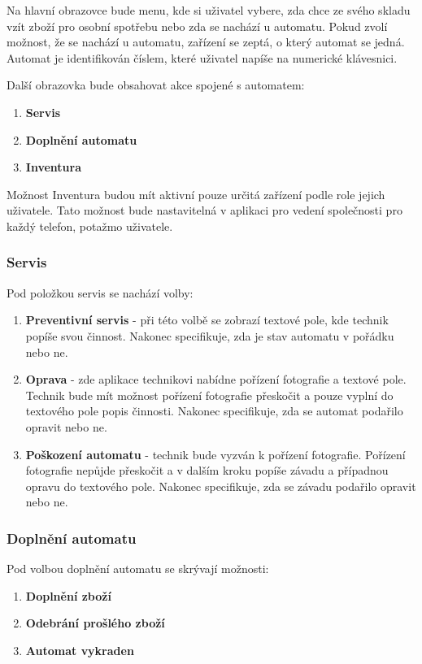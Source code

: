 \documentclass[a4paper,10pt]{article}
\begin{document}
Na hlavní obrazovce bude menu, kde si uživatel vybere, zda chce ze svého skladu vzít zboží pro osobní spotřebu nebo zda se nachází u automatu. Pokud zvolí možnost, že se nachází u automatu, zařízení se zeptá, o který automat se jedná. Automat je identifikován číslem, které uživatel napíše na numerické klávesnici.

Další obrazovka bude obsahovat akce spojené s automatem:

\begin{enumerate}
	\item \textbf{Servis}
	\item \textbf{Doplnění automatu}
	\item \textbf{Inventura}
\end{enumerate}

Možnost Inventura budou mít aktivní pouze určitá zařízení podle role jejich uživatele. Tato možnost bude nastavitelná v aplikaci pro vedení společnosti pro každý telefon, potažmo uživatele.

\subsubsection{Servis}
Pod položkou servis se nachází volby:
\begin{enumerate}
	\item \textbf{Preventivní servis} - při této volbě se zobrazí textové pole, kde technik popíše svou činnost. Nakonec specifikuje, zda je stav automatu v pořádku nebo ne.
	\item \textbf{Oprava} - zde aplikace technikovi nabídne pořízení fotografie a textové pole. Technik bude mít možnost pořízení fotografie přeskočit a pouze vyplní do textového pole popis činnosti. Nakonec specifikuje, zda se automat podařilo opravit nebo ne.
	\item \textbf{Poškození automatu} - technik bude vyzván k pořízení fotografie. Pořízení fotografie nepůjde přeskočit a v dalším kroku popíše závadu a případnou opravu do textového pole. Nakonec specifikuje, zda se závadu podařilo opravit nebo ne.
\end{enumerate}

\subsubsection{Doplnění automatu}
Pod volbou doplnění automatu se skrývají možnosti:
\begin{enumerate}
	\item \textbf{Doplnění zboží}
	\item \textbf{Odebrání prošlého zboží}
	\item \textbf{Automat vykraden}
\end{enumerate}
\end{document}
